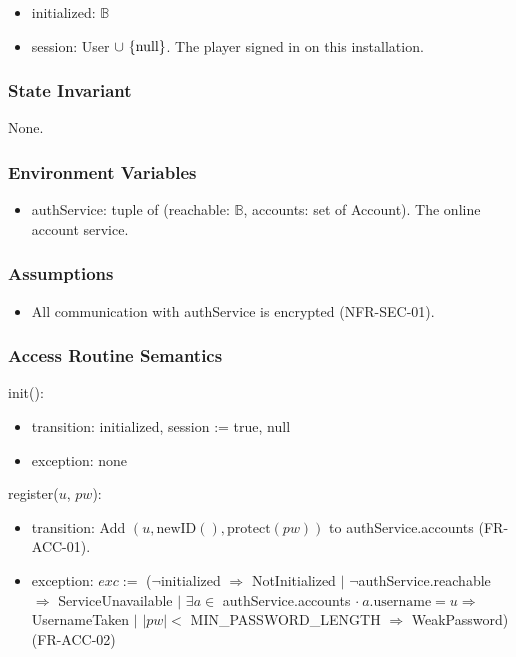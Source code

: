 \documentclass[12pt, titlepage]{article}
\newcommand{\True}{\textnormal{true}}
\newcommand{\nul}{\textnormal{null}}
\newcommand{\noinit}{$\neg$initialized $\Rightarrow$ NotInitialized}
\begin{document}
\begin{itemize}
\item initialized: $\mathbb{B}$
\item session: User $\cup \ \{\nul\}$. The player signed in on this
  installation.
\end{itemize}

\subsubsection{State Invariant}

None.

\subsubsection{Environment Variables}

\begin{itemize}
\item authService: tuple of (reachable: $\mathbb{B}$, accounts: set of
  Account). The online account service.
\end{itemize}

\subsubsection{Assumptions}

\begin{itemize}
\item All communication with authService is encrypted (NFR-SEC-01).
\end{itemize}

\subsubsection{Access Routine Semantics}

\noindent init():
\begin{itemize}
\item transition: initialized, session := \True, \nul
\item exception: none
\end{itemize}

\noindent register($u$, $pw$):
\begin{itemize}
\item transition: Add $(u, \text{newID}(), \text{protect}(pw))$ to
  authService.accounts (FR-ACC-01).
\item exception: $exc :=$ (\noinit{} $|$ $\neg$authService.reachable
  $\Rightarrow$ ServiceUnavailable $|$ $\exists a \in$ authService.accounts
  $\cdot\ a.\text{username} = u \Rightarrow$ UsernameTaken $|$ $|pw| <$
  MIN\_PASSWORD\_LENGTH $\Rightarrow$ WeakPassword) (FR-ACC-02)
\end{itemize}
\end{document}
